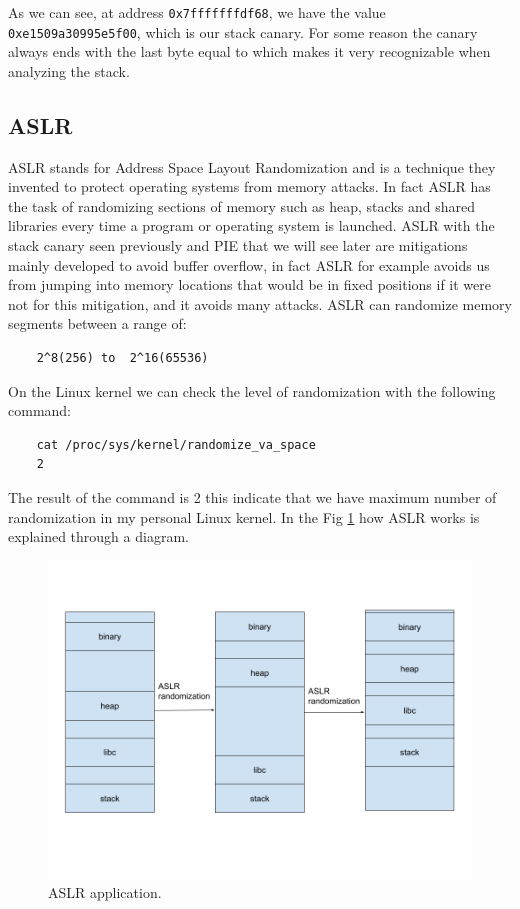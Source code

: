     As we can see, at address \texttt{0x7fffffffdf68}, we have the value \texttt{0xe1509a30995e5f00}, which is our stack canary.\newline
    For some reason the canary always ends with the last byte equal to  which makes it very recognizable when analyzing the stack.\newline
    \clearpage
    \subsection{ASLR}
    ASLR stands for Address Space Layout Randomization and is a technique they invented to protect operating systems from memory attacks.\newline
    In fact ASLR has the task of randomizing sections of memory such as heap, stacks and shared libraries every time a program or operating system is launched.\newline
    ASLR with the stack canary seen previously and PIE that we will see later are mitigations mainly developed to avoid buffer overflow, in fact ASLR for example avoids us from jumping into memory locations that would be in fixed positions if it were not for this mitigation, and it avoids many attacks.\newline
    ASLR can randomize memory segments between a range of:
    \begin{verbatim} 
    2^8(256) to  2^16(65536)
    \end{verbatim}
    On the Linux kernel we can check the level of randomization with the following command:
    \begin{verbatim}
    cat /proc/sys/kernel/randomize_va_space
    2
    \end{verbatim}
    The result of the command is 2 this indicate that we have maximum number of randomization in my personal Linux kernel.\newline
    In the Fig \ref{fig:ASLR_scheme} how ASLR works is explained through a diagram.
     \begin{figure}
         \centering
         \includegraphics[width=0.8\linewidth]{Images/aslr_explanation.png}
         \caption{ASLR application.}
         \label{fig:ASLR_scheme}
    \end{figure}

